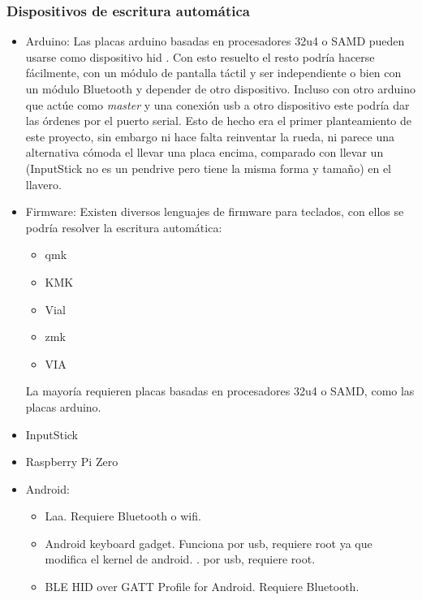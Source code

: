 \subsubsection{Dispositivos de escritura automática}
\begin{itemize}
    \item Arduino:
    Las placas arduino basadas en procesadores 32u4 o SAMD pueden usarse como dispositivo \gls{hid} \cite{arduinokeyboard}. Con esto resuelto el resto podría hacerse fácilmente, con un módulo de pantalla táctil y ser independiente o bien con un módulo Bluetooth y depender de otro dispositivo. Incluso con otro arduino que actúe como \textit{master} y una conexión \gls{usb} a otro dispositivo este podría dar las órdenes por el puerto serial. Esto de hecho era el primer planteamiento de este proyecto, sin embargo ni hace falta reinventar la rueda, ni parece una alternativa cómoda el llevar una placa encima, comparado con llevar un  (InputStick no es un pendrive pero tiene la misma forma y tamaño) en el llavero.
    \item Firmware:
    Existen diversos lenguajes de firmware para teclados, con ellos se podría resolver la escritura automática:
    \begin{itemize}
        \item \gls{qmk} \cite{qmk}
        \item KMK \cite{kmk}
        \item Vial \cite{vial}
        \item \gls{zmk} \cite{zmk}
        \item VIA \cite{via}
    \end{itemize}
    La mayoría requieren placas basadas en procesadores 32u4 o SAMD, como las placas arduino.
    \item InputStick
    
    \item Raspberry Pi Zero

    \item Android:
    
    \begin{itemize}
        \item Laa. Requiere Bluetooth o wifi. \cite{laa}
        \item Android keyboard gadget. Funciona por \gls{usb}, requiere root ya que modifica el kernel de android. \cite{android-keyboard-gadget}. 
            por usb, requiere root.
        \item BLE HID over GATT Profile for Android. Requiere Bluetooth. \cite{BLE-HID-Peripheral-for-Android}
    \end{itemize}
\end{itemize}
